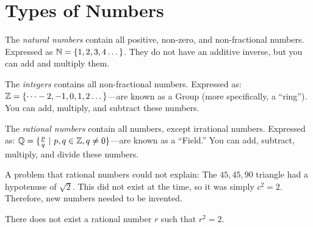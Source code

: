 \renewcommand{\theenumi}{\arabic{enumi}}
\renewcommand{\labelenumi}{\theenumi.}
\section{Types of Numbers}

\begin{definition}

    The \textit{natural numbers} contain all positive, non-zero, and non-fractional numbers. Expressed as \(\mathbb{N} = \{1,2,3,4\dots\}\). They do not have an additive inverse, but you can add and multiply them.
\end{definition}

\begin{definition}

    The \textit{integers} contains all non-fractional numbers. Expressed as: \(\mathbb{Z} = \{\dots-2,-1,0,1,2\dots\}\)---are known as a Group (more specifically, a ``ring''). You can add, multiply, and subtract these numbers.
\end{definition}

\begin{definition}

    The \textit{rational numbers} contain all numbers, except irrational numbers. Expressed as: \(\mathbb{Q} = \{\frac{p}{q} \ | \ p,q \in \mathbb{Z}, q \ne 0\}\)---are known as a ``Field.'' You can add, subtract, multiply, and divide these numbers.

\end{definition}

A problem that rational numbers could not explain: The \(45, 45, 90\) triangle had a hypotenuse of \(\sqrt{2}\). This did not exist at the time, so it was simply \(c^2 = 2\). Therefore, new numbers needed to be invented.

\begin{theorem}
    There does not exist a rational number \(r\) such that \(r^2 = 2\).
\end{theorem}

